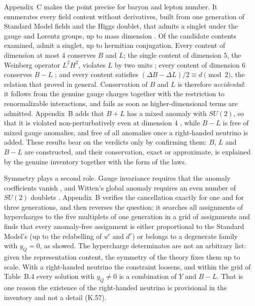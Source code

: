 \documentclass{situationist-preprint}
\begin{document}
Appendix~C makes the point precise for baryon and lepton number. It enumerates every field content without derivatives, built from one generation of Standard Model fields and the Higgs doublet, that admits a singlet under the gauge and Lorentz groups, up to mass dimension \vvDmaxC{}. Of the \vvNCtested{} candidate contents examined, \vvNCfound{} admit a singlet, \vvNCreps{} up to hermitian conjugation. Every content of dimension at most $4$ conserves $B$ and $L$; the single content of dimension $5$, the Weinberg operator $L^2H^2$, violates $L$ by two units \citep{Weinberg1979}; every content of dimension $6$ conserves $B-L$ \citep{Weinberg1979,WilczekZee1979}; and every content satisfies $(\Delta B - \Delta L)/2 \equiv d \pmod 2$, the relation that \citet{Kobach2016} proved in general. Conservation of $B$ and $L$ is therefore \emph{accidental}: it follows from the genuine gauge charges together with the restriction to renormalizable interactions, and fails as soon as higher-dimensional terms are admitted. Appendix~B adds that $B+L$ has a mixed anomaly with $SU(2)$, so that it is violated non-perturbatively even at dimension $4$ \citep{tHooft1976}, while $B-L$ is free of mixed gauge anomalies, and free of all anomalies once a right-handed neutrino is added. These results bear on the verdicts only by confirming them: $B$, $L$ and $B-L$ are constructed, and their conservation, exact or approximate, is explained by the genuine inventory together with the form of the laws.

Symmetry plays a second role. Gauge invariance requires that the anomaly coefficients vanish \citep{GrossJackiw1972,BouchiatEtAl1972}, and Witten's global anomaly requires an even number of $SU(2)$ doublets \citep{Witten1982}. Appendix~B verifies the cancellation exactly for one and for three generations, and then reverses the question: it searches all assignments of hypercharges to the five multiplets of one generation in a grid of \vvNBthreeSpace{} assignments and finds that every anomaly-free assignment is either proportional to the Standard Model's (up to the relabelling of $u^c$ and $d^c$) or belongs to a degenerate family with $y_Q = 0$, as \citet{GengMarshak1989} showed. The hypercharge determinates are not an arbitrary list: given the representation content, the symmetry of the theory fixes them up to scale. With a right-handed neutrino the constraint loosens, and within the grid of Table~B.4 every solution with $y_Q \neq 0$ is a combination of $Y$ and $B-L$. That is one reason the existence of the right-handed neutrino is provisional in the inventory and not a detail (K.57).
\end{document}
